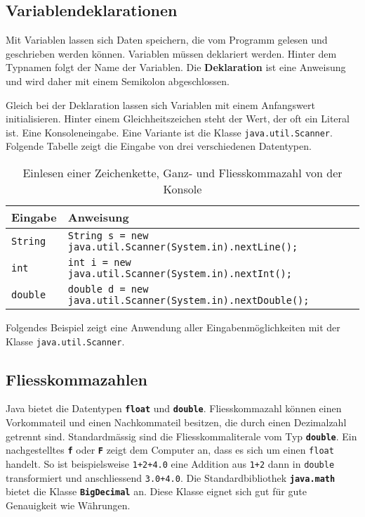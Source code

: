 \subsection{Variablendeklarationen}
Mit Variablen lassen sich Daten speichern, die vom Programm gelesen und geschrieben werden können. Variablen müssen deklariert werden. Hinter dem Typnamen folgt der Name der Variablen. Die \textbf{Deklaration} ist eine Anweisung und wird daher mit einem Semikolon abgeschlossen.

Gleich bei der Deklaration lassen sich Variablen mit einem Anfangswert initialisieren. Hinter einem Gleichheitszeichen steht der Wert, der oft ein Literal ist.
\newline\newline
Eine Konsoleneingabe. Eine Variante ist die Klasse \texttt{java.util.Scanner}. Folgende Tabelle zeigt die Eingabe von drei verschiedenen Datentypen.
\begin{table}[H]
\centering
\begin{tabular}{ll}
\hline
Eingabe & Anweisung\\\hline
\texttt{String}&\texttt{String s = new java.util.Scanner(System.in).nextLine();}\\
\texttt{int}&\texttt{int i = new java.util.Scanner(System.in).nextInt();}\\
\texttt{double}&\texttt{double d = new java.util.Scanner(System.in).nextDouble();}\\\hline
\end{tabular}
\caption{Einlesen einer Zeichenkette, Ganz- und Fliesskommazahl von der Konsole}
\end{table}
\noindent Folgendes Beispiel zeigt eine Anwendung aller Eingabenmöglichkeiten mit der Klasse \texttt{java.util.Scanner}.

\subsection{Fliesskommazahlen}
Java bietet die Datentypen \textbf{\texttt{float}} und \textbf{\texttt{double}}. Fliesskommazahl können einen Vorkommateil und einen Nachkommateil besitzen, die durch einen Dezimalzahl getrennt sind. Standardmässig sind die Fliesskommaliterale vom Typ \textbf{\texttt{double}}. Ein nachgestelltes \textbf{\texttt{f}} oder \textbf{\texttt{F}} zeigt dem Computer an, dass es sich um einen \texttt{float} handelt.
\newline\newline
So ist beispielsweise \texttt{1+2+4.0} eine Addition aus \texttt{1+2} dann in \texttt{double} transformiert und anschliessend \texttt{3.0+4.0}. Die Standardbibliothek \textbf{\texttt{java.math}} bietet die Klasse \textbf{\texttt{BigDecimal}} an. Diese Klasse eignet sich gut für gute Genauigkeit wie Währungen.
